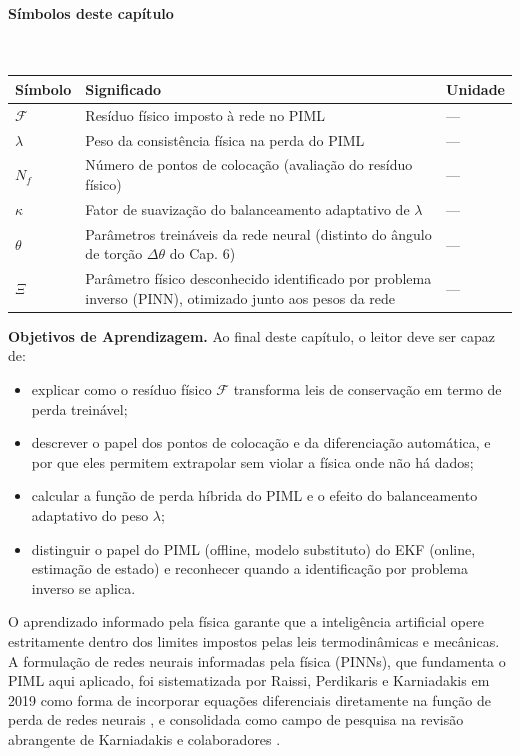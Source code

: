 \documentclass[12pt,a4paper]{article}
\numberwithin{equation}{section}
\numberwithin{table}{section}
\numberwithin{figure}{section}
\begin{document}
\paragraph{Símbolos deste capítulo}\mbox{}\\[-0.5em]
{\small
\begin{longtable}{>{\raggedright\arraybackslash}p{2.6cm} >{\raggedright\arraybackslash}p{9.2cm} >{\raggedright\arraybackslash}p{2.6cm}}
	\toprule
	\textbf{Símbolo} & \textbf{Significado} & \textbf{Unidade} \\ \midrule
	\endhead
	$\mathcal{F}$ & Resíduo físico imposto à rede no PIML & --- \\
	$\lambda$ & Peso da consistência física na perda do PIML & --- \\
	$N_f$ & Número de pontos de colocação (avaliação do resíduo físico) & --- \\
	$\kappa$ & Fator de suavização do balanceamento adaptativo de $\lambda$ & --- \\
	$\theta$\dag & Parâmetros treináveis da rede neural (distinto do ângulo de torção $\Delta\theta$ do Cap. 6) & --- \\
	$\Xi$ & Parâmetro físico desconhecido identificado por problema inverso (PINN), otimizado junto aos pesos da rede & --- \\
	\bottomrule
\end{longtable}
}

	\textbf{Objetivos de Aprendizagem.} Ao final deste capítulo, o leitor
	deve ser capaz de:
	\begin{itemize}
		\item explicar como o resíduo físico $\mathcal{F}$ transforma leis
		de conservação em termo de perda treinável;
		\item descrever o papel dos pontos de colocação e da
		diferenciação automática, e por que eles permitem extrapolar sem
		violar a física onde não há dados;
		\item calcular a função de perda híbrida do PIML e o efeito do
		balanceamento adaptativo do peso $\lambda$;
		\item distinguir o papel do PIML (offline, modelo substituto) do
		EKF (online, estimação de estado) e reconhecer quando a
		identificação por problema inverso se aplica.
	\end{itemize}

	O aprendizado informado pela física garante que a inteligência artificial opere estritamente dentro dos limites impostos pelas leis termodinâmicas e mecânicas. A formulação de redes neurais informadas pela física (PINNs), que fundamenta o PIML aqui aplicado, foi sistematizada por Raissi, Perdikaris e Karniadakis em 2019 como forma de incorporar equações diferenciais diretamente na função de perda de redes neurais \cite{piml}, e consolidada como campo de pesquisa na revisão abrangente de Karniadakis e colaboradores \cite{piml2}.
	
\end{document}
